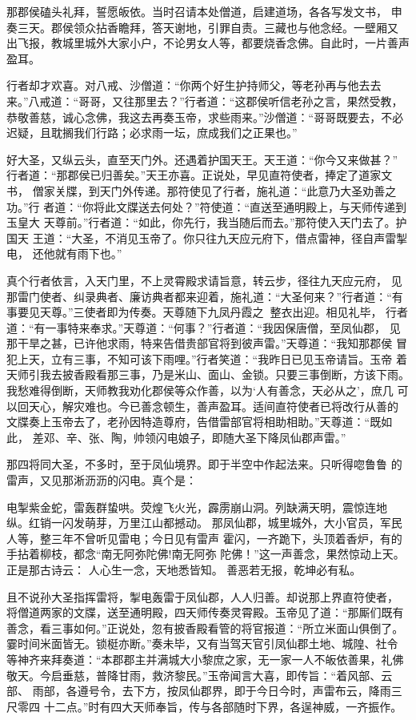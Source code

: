 那郡侯磕头礼拜，誓愿皈依。当时召请本处僧道，启建道场，各各写发文书，
申奏三天。郡侯领众拈香瞻拜，答天谢地，引罪自责。三藏也与他念经。一壁厢又
出飞报，教城里城外大家小户，不论男女人等，都要烧香念佛。自此时，一片善声
盈耳。

行者却才欢喜。对八戒、沙僧道：“你两个好生护持师父，等老孙再与他去去
来。”八戒道：“哥哥，又往那里去？”行者道：“这郡侯听信老孙之言，果然受教，
恭敬善慈，诚心念佛，我这去再奏玉帝，求些雨来。”沙僧道：“哥哥既要去，不必
迟疑，且耽搁我们行路；必求雨一坛，庶成我们之正果也。”

好大圣，又纵云头，直至天门外。还遇着护国天王。天王道：“你今又来做甚？”
行者道：“那郡侯已归善矣。”天王亦喜。正说处，早见直符使者，捧定了道家文书，
僧家关牒，到天门外传递。那符使见了行者，施礼道：“此意乃大圣劝善之功。”行
者道：“你将此文牒送去何处？”符使道：“直送至通明殿上，与天师传递到玉皇大
天尊前。”行者道：“如此，你先行，我当随后而去。”那符使入天门去了。护国天
王道：“大圣，不消见玉帝了。你只往九天应元府下，借点雷神，径自声雷掣电，
还他就有雨下也。”

真个行者依言，入天门里，不上灵霄殿求请旨意，转云步，径往九天应元府，
见那雷门使者、纠录典者、廉访典者都来迎着，施礼道：“大圣何来？”行者道：“有
事要见天尊。”三使者即为传奏。天尊随下九凤丹霞之，整衣出迎。相见礼毕，
行者道：“有一事特来奉求。”天尊道：“何事？”行者道：“我因保唐僧，至凤仙郡，
见那干旱之甚，已许他求雨，特来告借贵部官将到彼声雷。”天尊道：“我知那郡侯
冒犯上天，立有三事，不知可该下雨哩。”行者笑道：“我昨日已见玉帝请旨。玉帝
着天师引我去披香殿看那三事，乃是米山、面山、金锁。只要三事倒断，方该下雨。
我愁难得倒断，天师教我劝化郡侯等众作善，以为‘人有善念，天必从之’，庶几
可以回天心，解灾难也。今已善念顿生，善声盈耳。适间直符使者已将改行从善的
文牒奏上玉帝去了，老孙因特造尊府，告借雷部官将相助相助。”天尊道：“既如此，
差邓、辛、张、陶，帅领闪电娘子，即随大圣下降凤仙郡声雷。”

那四将同大圣，不多时，至于凤仙境界。即于半空中作起法来。只听得唿鲁鲁
的雷声，又见那淅沥沥的闪电。真个是：

电掣紫金蛇，雷轰群蛰哄。荧煌飞火光，霹雳崩山洞。列缺满天明，震惊连地
纵。红销一闪发萌芽，万里江山都撼动。
那凤仙郡，城里城外，大小官员，军民人等，整三年不曾听见雷电；今日见有雷声
霍闪，一齐跪下，头顶着香炉，有的手拈着柳枝，都念“南无阿弥陀佛!南无阿弥
陀佛！”这一声善念，果然惊动上天。正是那古诗云：
人心生一念，天地悉皆知。
善恶若无报，乾坤必有私。

且不说孙大圣指挥雷将，掣电轰雷于凤仙郡，人人归善。却说那上界直符使者，
将僧道两家的文牒，送至通明殿，四天师传奏灵霄殿。玉帝见了道：“那厮们既有
善念，看三事如何。”正说处，忽有披香殿看管的将官报道：“所立米面山俱倒了。
霎时间米面皆无。锁梃亦断。”奏未毕，又有当驾天官引凤仙郡土地、城隍、社令
等神齐来拜奏道：“本郡郡主并满城大小黎庶之家，无一家一人不皈依善果，礼佛
敬天。今启垂慈，普降甘雨，救济黎民。”玉帝闻言大喜，即传旨：“着风部、云部、
雨部，各遵号令，去下方，按凤仙郡界，即于今日今时，声雷布云，降雨三尺零四
十二点。”时有四大天师奉旨，传与各部随时下界，各逞神威，一齐振作。

